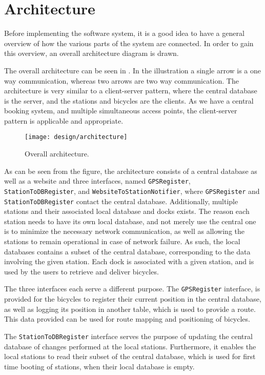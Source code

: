 \section{Architecture}\label{sec:architecture}
Before implementing the software system, it is a good idea to have a general overview of how the various parts of the system are connected.
In order to gain this overview, an overall architecture diagram is drawn.

The overall architecture can be seen in .
In the illustration a single arrow is a one way communication, whereas two arrows are two way communication.
The architecture is very similar to a client-server pattern, where the central database is the server, and the stations and bicycles are the clients.
As we have a central booking system, and multiple simultaneous access points, the client-server pattern is applicable and appropriate.

\begin{figure}[h]
	\centering
	\texttt{[image: design/architecture]}
	\caption{Overall architecture.}\label{fig:overallarch}
\end{figure}

As can be seen from the figure, the architecture consists of a central database as well as a website and three interfaces, named \texttt{GPSRegister}, \texttt{StationToDBRegister}, and \texttt{WebsiteTo\-StationNotifier}, where \texttt{GPS\-Register} and \texttt{StationToDBRegister} contact the central database.
Additionally, multiple stations and their associated local database and docks exists.
The reason each station needs to have its own local database, and not merely use the central one is to minimize the necessary network communication, as well as allowing the stations to remain operational in case of network failure.
As such, the local databases contains a subset of the central database, corresponding to the data involving the given station.
Each dock is associated with a given station, and is used by the users to retrieve and deliver bicycles.

The three interfaces each serve a different purpose.
The \texttt{GPS\-Register} interface, is provided for the bicycles to register their current position in the central database, as well as logging its position in another table, which is used to provide a route.
This data provided can be used for route mapping and positioning of bicycles.

The \texttt{StationToDBRegister} interface serves the purpose of updating the central database of changes performed at the local stations. Furthermore, it enables the local stations to read their subset of the central database, which is used for first time booting of stations, when their local database is empty.


